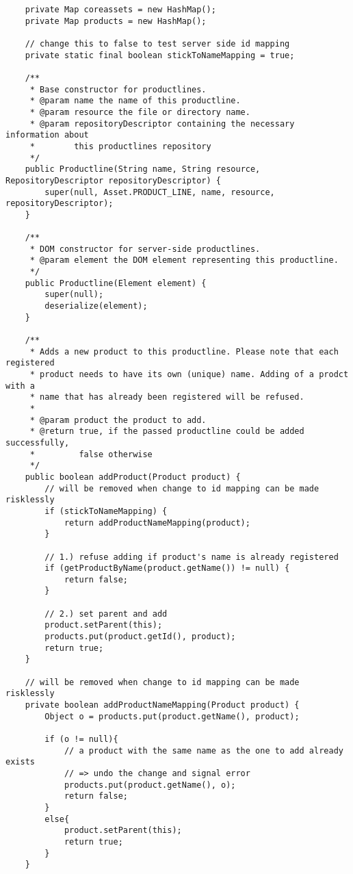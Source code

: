 \begin{verbatim}
	private Map coreassets = new HashMap();
	private Map products = new HashMap();
    
    // change this to false to test server side id mapping
    private static final boolean stickToNameMapping = true;
	
	/**
	 * Base constructor for productlines.
	 * @param name the name of this productline.
	 * @param resource the file or directory name.
	 * @param repositoryDescriptor containing the necessary information about
	 *        this productlines repository
	 */
	public Productline(String name, String resource, RepositoryDescriptor repositoryDescriptor) {
		super(null, Asset.PRODUCT_LINE, name, resource, repositoryDescriptor);
	}

	/**
	 * DOM constructor for server-side productlines.
	 * @param element the DOM element representing this productline.
	 */
	public Productline(Element element) {
		super(null);
		deserialize(element);
	}

	/**
	 * Adds a new product to this productline. Please note that each registered
     * product needs to have its own (unique) name. Adding of a prodct with a
     * name that has already been registered will be refused. 
     * 
	 * @param product the product to add.
     * @return true, if the passed productline could be added successfully, 
     *         false otherwise
	 */
	public boolean addProduct(Product product) {
        // will be removed when change to id mapping can be made risklessly
        if (stickToNameMapping) {
            return addProductNameMapping(product);
        }
        
        // 1.) refuse adding if product's name is already registered
        if (getProductByName(product.getName()) != null) {
            return false;
        }
        
        // 2.) set parent and add 
        product.setParent(this);
		products.put(product.getId(), product);
		return true;
	}
	
    // will be removed when change to id mapping can be made risklessly
    private boolean addProductNameMapping(Product product) {
        Object o = products.put(product.getName(), product);
        
        if (o != null){
            // a product with the same name as the one to add already exists
            // => undo the change and signal error
            products.put(product.getName(), o);
            return false;
        }
        else{
            product.setParent(this);
            return true;
        }
    }
    

\end{verbatim}
